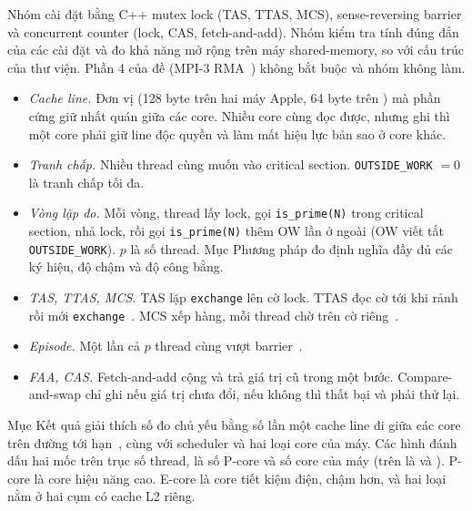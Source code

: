 Nhóm cài đặt bằng C++ mutex lock (TAS, TTAS, MCS), sense-reversing barrier và concurrent counter
(lock, CAS, fetch-and-add). Nhóm kiểm tra tính đúng đắn của các cài đặt và đo khả năng mở rộng trên máy
shared-memory, so với cấu trúc của thư viện. Phần 4 của đề (MPI-3 RMA~\cite{mpi41}) không bắt buộc và nhóm không làm.

\begin{itemize}[nosep]
  \item \emph{Cache line.} Đơn vị (128 byte trên hai máy Apple, 64 byte trên )
    mà phần cứng giữ nhất quán giữa các core. Nhiều core cùng đọc được, nhưng ghi thì một core phải giữ
    line độc quyền và làm mất hiệu lực bản sao ở core khác.
  \item \emph{Tranh chấp.} Nhiều thread cùng muốn vào critical section. \texttt{OUTSIDE\_WORK}
    $= 0$ là tranh chấp tối đa.
  \item \emph{Vòng lặp đo.} Mỗi vòng, thread lấy lock, gọi \texttt{is\_prime(N)} trong critical
    section, nhả lock, rồi gọi \texttt{is\_prime(N)} thêm OW lần ở ngoài (OW viết tắt
    \texttt{OUTSIDE\_WORK}). $p$ là số thread. Mục Phương pháp đo định nghĩa đầy đủ các ký hiệu, độ
    chậm và độ công bằng.
  \item \emph{TAS, TTAS, MCS.} TAS lặp \texttt{exchange} lên cờ lock. TTAS đọc cờ tới khi rảnh rồi mới
    \texttt{exchange}~\cite{anderson1990spinlock}. MCS xếp hàng, mỗi thread chờ trên cờ
    riêng~\cite{mellorcrummey1991mcs}.
  \item \emph{Episode.} Một lần cả $p$ thread cùng vượt barrier~\cite{hensgen1988barrier}.
  \item \emph{FAA, CAS.} Fetch-and-add cộng và trả giá trị cũ trong một bước. Compare-and-swap chỉ ghi
    nếu giá trị chưa đổi, nếu không thì thất bại và phải thử lại.
\end{itemize}

Mục Kết quả giải thích số đo chủ yếu bằng số lần một cache line đi giữa các core trên đường tới
hạn~\cite{herlihy2020art}, cùng với scheduler và hai loại core của máy. Các hình đánh dấu hai mốc trên
trục số thread, là số P-core và số core của máy (trên  là  và
). P-core là core hiệu năng cao. E-core là core tiết kiệm điện, chậm hơn, và hai
loại nằm ở hai cụm có cache L2 riêng.

